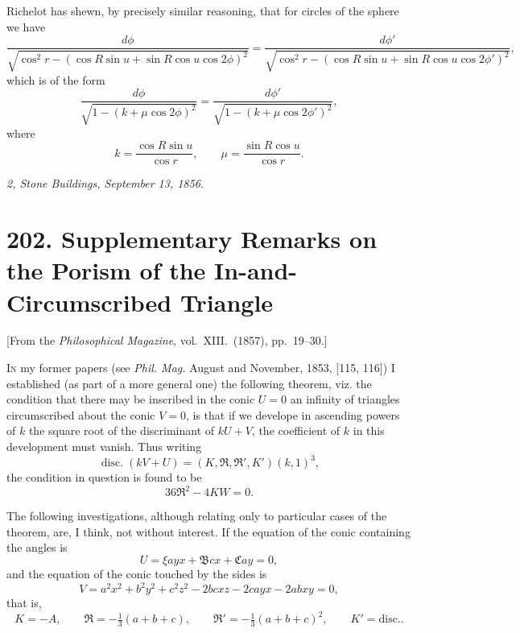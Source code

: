 \documentclass[12pt,a4paper]{article}
\theoremstyle{definition}
\begin{document}
\smallskip

Richelot has shewn, by precisely similar reasoning, that for circles of the sphere
we have
\[
\frac{d\phi}{\sqrt{\cos^2 r - (\cos R \sin u + \sin R \cos u \cos 2\phi)^2}} = \frac{d\phi'}{\sqrt{\cos^2 r - (\cos R \sin u + \sin R \cos u \cos 2\phi')^2}},
\]
which is of the form
\[
\frac{d\phi}{\sqrt{1 - (k + \mu \cos 2\phi)^2}} = \frac{d\phi'}{\sqrt{1 - (k + \mu \cos 2\phi')^2}},
\]
where
\[
k = \frac{\cos R \sin u}{\cos r}, \qquad \mu = \frac{\sin R \cos u}{\cos r}.
\]

\bigskip

\noindent\textit{2, Stone Buildings, September 13, 1856.}

\newpage


\section*{202. Supplementary Remarks on the Porism of the In-and-Circumscribed Triangle}

\begin{center}
[From the \textit{Philosophical Magazine}, vol.~XIII.~(1857), pp.~19--30.]
\end{center}

\bigskip

I\textsc{n} my former papers (see \textit{Phil. Mag.} August and November, 1853, [115, 116]) I
established (as part of a more general one) the following theorem, viz. the condition
that there may be inscribed in the conic $U = 0$ an infinity of triangles circumscribed
about the conic $V = 0$, is that if we develope in ascending powers of $k$ the square root
of the discriminant of $kU + V$, the coefficient of $k$ in this development must vanish.
Thus writing
\[
\operatorname{disc.}(kV + U) = (K, \mathfrak{R}, \mathfrak{R}', K')(k, 1)^3,
\]
the condition in question is found to be
\[
36\mathfrak{R}^2 - 4KW = 0.
\]

The following investigations, although relating only to particular cases of the
theorem, are, I think, not without interest. If the equation of the conic containing
the angles is
\[
U = \xi a y x + \mathfrak{B} c x + \mathfrak{C} a y = 0,
\]
and the equation of the conic touched by the sides is
\[
V = a^2 x^2 + b^2 y^2 + c^2 z^2 - 2bc x z - 2ca y x - 2ab x y = 0,
\]
that is,
\[
K = -A,\qquad \mathfrak{R} = -\tfrac{1}{3}(a + b + c),\qquad \mathfrak{R}' = -\tfrac{1}{3}(a + b + c)^2,\qquad K' = \text{disc.}.
\]
\end{document}
